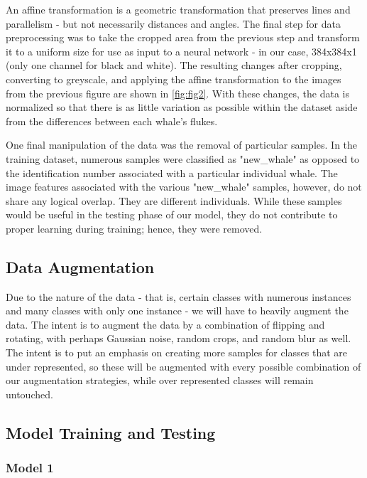 \documentclass[paper=a4, fontsize=11pt]{scrartcl}
\numberwithin{equation}{section}		%
\numberwithin{table}{section}				%
\begin{document}
An affine transformation is a geometric transformation that preserves lines and parallelism - but not necessarily distances and angles. The final step for data preprocessing was to take the cropped area from the previous step and transform it to a uniform size for use as input to a neural network - in our case, 384x384x1 (only one channel for black and white). The resulting changes after cropping, converting to greyscale, and applying the affine transformation to the images from the previous figure are shown in \autoref{fig:fig2}. With these changes, the data is normalized so that there is as little variation as possible within the dataset aside from the differences between each whale's flukes.

One final manipulation of the data was the removal of particular samples. In the training dataset, numerous samples were classified as "new\_whale" as opposed to the identification number associated with a particular individual whale. The image features associated with the various "new\_whale" samples, however, do not share any logical overlap. They are different individuals. While these samples would be useful in the testing phase of our model, they do not contribute to proper learning during training; hence, they were removed.

\subsection{Data Augmentation}\label{subsec:Augmentation}
Due to the nature of the data - that is, certain classes with numerous instances and many classes with only one instance - we will have to heavily augment the data. The intent is to augment the data by a combination of flipping and rotating, with perhaps Gaussian noise, random crops, and random blur as well. The intent is to put an emphasis on creating more samples for classes that are under represented, so these will be augmented with every possible combination of our augmentation strategies, while over represented classes will remain untouched. 

\subsection{Model Training and Testing}

\subsubsection{Model 1}
\end{document}
